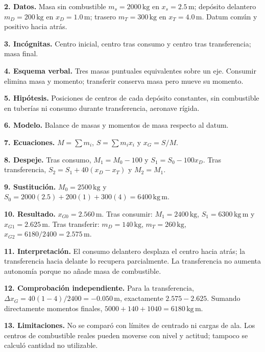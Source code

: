 \textbf{2. Datos.} Masa sin combustible $m_s=2000\,\mathrm{kg}$ en $x_s=2.5\,\mathrm{m}$; depósito delantero $m_D=200\,\mathrm{kg}$ en $x_D=1.0\,\mathrm{m}$; trasero $m_T=300\,\mathrm{kg}$ en $x_T=4.0\,\mathrm{m}$. Datum común y positivo hacia atrás.

\textbf{3. Incógnitas.} Centro inicial, centro tras consumo y centro tras transferencia; masa final.

\textbf{4. Esquema verbal.} Tres masas puntuales equivalentes sobre un eje. Consumir elimina masa y momento; transferir conserva masa pero mueve su momento.

\textbf{5. Hipótesis.} Posiciones de centros de cada depósito constantes, sin combustible en tuberías ni consumo durante transferencia, aeronave rígida.

\textbf{6. Modelo.} Balance de masas y momentos de masa respecto al datum.

\textbf{7. Ecuaciones.} $M=\sum m_i$, $S=\sum m_ix_i$ y $x_G=S/M$.

\textbf{8. Despeje.} Tras consumo, $M_1=M_0-100$ y $S_1=S_0-100x_D$. Tras transferencia, $S_2=S_1+40(x_D-x_T)$ y $M_2=M_1$.

\textbf{9. Sustitución.} $M_0=2500\,\mathrm{kg}$ y $S_0=2000(2.5)+200(1)+300(4)=6400\,\mathrm{kg\,m}$.

\textbf{10. Resultado.} $x_{G0}=2.560\,\mathrm{m}$. Tras consumir: $M_1=2400\,\mathrm{kg}$, $S_1=6300\,\mathrm{kg\,m}$ y $x_{G1}=2.625\,\mathrm{m}$. Tras transferir: $m_D=140\,\mathrm{kg}$, $m_T=260\,\mathrm{kg}$, $x_{G2}=6180/2400=2.575\,\mathrm{m}$.

\textbf{11. Interpretación.} El consumo delantero desplaza el centro hacia atrás; la transferencia hacia delante lo recupera parcialmente. La transferencia no aumenta autonomía porque no añade masa de combustible.

\textbf{12. Comprobación independiente.} Para la transferencia, $\Delta x_G=40(1-4)/2400=-0.050\,\mathrm{m}$, exactamente $2.575-2.625$. Sumando directamente momentos finales, $5000+140+1040=6180\,\mathrm{kg\,m}$.

\textbf{13. Limitaciones.} No se comparó con límites de centrado ni cargas de ala. Los centros de combustible reales pueden moverse con nivel y actitud; tampoco se calculó cantidad no utilizable.

